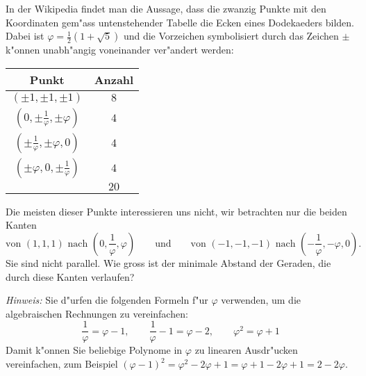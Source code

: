 In der Wikipedia findet man die Aussage, dass die zwanzig Punkte mit
den Koordinaten gem"ass untenstehender Tabelle die Ecken eines
Dodekaeders bilden. Dabei ist
$\varphi=\frac12(1+\sqrt{5})$ und die Vorzeichen symbolisiert durch
das Zeichen $\pm$ k"onnen unabh"angig voneinander ver"andert werden:
\begin{center}
\begin{tabular}{|c|c|}
\hline
Punkt&Anzahl\\
\hline
$(\pm 1,\pm 1,\pm 1)$&$8$\\
$(0,\pm\frac1{\varphi},\pm\varphi)$&$4$\\
$(\pm\frac1{\varphi},\pm\varphi,0)$&$4$\\
$(\pm\varphi,0,\pm\frac1{\varphi})$&$4$\\
\hline
&$20$\\
\hline
\end{tabular}
\end{center}
Die meisten dieser Punkte interessieren uns nicht, wir betrachten
nur die beiden Kanten
\[
\text{von $(1,1,1)$ nach $(0,\frac1{\varphi},\varphi)$}
\qquad\text{und}\qquad
\text{von $(-1,-1,-1)$ nach $(-\frac1{\varphi},-\varphi,0).$}
\]
Sie sind nicht parallel. Wie gross ist der minimale
Abstand der Geraden, die durch diese Kanten verlaufen?

{\it Hinweis:} Sie d"urfen die folgenden Formeln f"ur $\varphi$ verwenden,
um die algebraischen Rechnungen zu vereinfachen:
\[
\frac1{\varphi}=\varphi-1,\qquad
\frac1{\varphi}-1=\varphi-2,\qquad
\varphi^2=\varphi+1
\]
Damit k"onnen Sie beliebige Polynome in $\varphi$ zu linearen Ausdr"ucken
vereinfachen, zum Beispiel $(\varphi-1)^2=\varphi^2-2\varphi+1=\varphi+1-2\varphi+1=2-2\varphi$.

